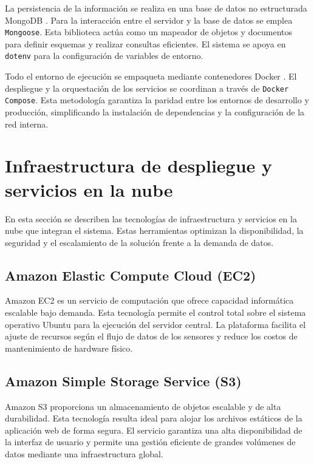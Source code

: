 La persistencia de la información se realiza en una base de datos no estructurada MongoDB \cite{mongodb_web}. Para la interacción entre el servidor y la base de datos se emplea \texttt{Mongoose}. Esta biblioteca actúa como un mapeador de objetos y documentos para definir esquemas y realizar consultas eficientes. El sistema se apoya en \texttt{dotenv} para la configuración de variables de entorno.

Todo el entorno de ejecución se empaqueta mediante contenedores Docker \cite{docker_web}. El despliegue y la orquestación de los servicios se coordinan a través de \texttt{Docker Compose}. Esta metodología garantiza la paridad entre los entornos de desarrollo y producción, simplificando la instalación de dependencias y la configuración de la red interna.

\section{Infraestructura de despliegue y servicios en la nube}

En esta sección se describen las tecnologías de infraestructura y servicios en la nube que integran el sistema. Estas herramientas optimizan la disponibilidad, la seguridad y el escalamiento de la solución frente a la demanda de datos.

\subsection{Amazon Elastic Compute Cloud (EC2)}

Amazon EC2 \cite{aws_ec2} es un servicio de computación que ofrece capacidad informática escalable bajo demanda. Esta tecnología permite el control total sobre el sistema operativo Ubuntu para la ejecución del servidor central. La plataforma facilita el ajuste de recursos según el flujo de datos de los sensores y reduce los costos de mantenimiento de hardware físico.

\subsection{Amazon Simple Storage Service (S3)}

Amazon S3 \cite{aws_s3} proporciona un almacenamiento de objetos escalable y de alta durabilidad. Esta tecnología resulta ideal para alojar los archivos estáticos de la aplicación web de forma segura. El servicio garantiza una alta disponibilidad de la interfaz de usuario y permite una gestión eficiente de grandes volúmenes de datos mediante una infraestructura global.

